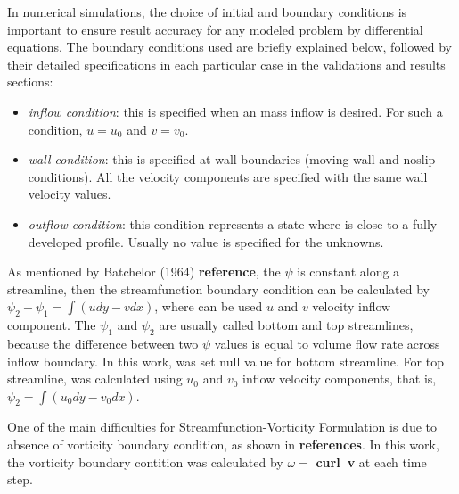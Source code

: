 In numerical simulations, the choice of initial and boundary conditions
is important to ensure result accuracy for any modeled problem 
by differential equations. 
The boundary conditions used
are briefly explained below, 
followed by their detailed specifications 
in each particular case in the validations and results sections:

\begin{itemize}
 \item \textit{inflow condition}:
 this is specified when an mass inflow is desired.
 For such a condition, $u = u_{0}$
 and $v = v_{0}$.

 \item \textit{wall condition}:
 this is specified at wall boundaries (moving wall
 and noslip conditions).
 All the velocity components are specified with 
 the same wall velocity values.

 \item \textit{outflow condition}: 
 this condition represents a state where is close to a
 fully developed profile.
 Usually no value is specified for the unknowns.
\end{itemize}

As mentioned by Batchelor (1964) \textbf{reference},
the $\psi$ is constant along a streamline, then
the streamfunction boundary condition can be calculated by
$\psi_{2} - \psi_{1} = \int \left(udy - vdx\right)$,
where can be used $u$ and $v$ velocity inflow component.
The $\psi_{1}$ and $\psi_{2}$ are usually called 
bottom and top streamlines, because the difference
between two $\psi$ values is equal to volume flow
rate across inflow boundary. In this work, was set
null value for bottom streamline. For top streamline,
was calculated using $u_{0}$ and $v_{0}$ inflow velocity
components, that is, $\psi_{2} = \int \left(u_{0}dy - v_{0}dx\right)$.

\medskip
One of the main difficulties for
Streamfunction-Vorticity Formulation is due to absence of vorticity
boundary condition, as shown in \textbf{references}.
In this work, the vorticity boundary contition
was calculated by $\omega =$ \textbf{curl\ v}
at each time step.
